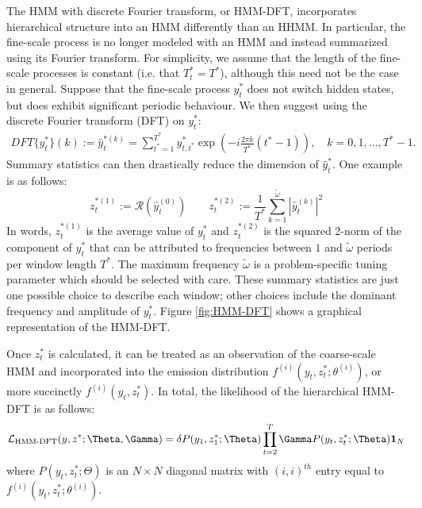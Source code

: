 The HMM with discrete Fourier transform, or HMM-DFT, incorporates hierarchical structure into an HMM differently than an HHMM. In particular, the fine-scale process is no longer modeled with an HMM and instead summarized using its Fourier transform. For simplicity, we assume that the length of the fine-scale processes is constant (i.e. that $T^*_t = T^*$), although this need not be the case in general. Suppose that the fine-scale process $y^*_t$ does not switch hidden states, but does exhibit significant periodic behaviour. We then suggest using the discrete Fourier transform (DFT) on $y^*_t$:
%
\begin{align*}
    DFT\{y^*_t\}(k) := \hat{y}^{*(k)}_{t} = \sum_{t^* = 1}^{T^*} y^*_{t,t^*}\exp\left(-i \frac{2\pi k}{T^*} (t^*-1)\right), \quad k = 0, 1, \ldots, T^*-1.
\end{align*}
%
Summary statistics can then drastically reduce the dimension of $\hat{y}^*_t$. One example is as follows:
%
\begin{equation}
    \label{eqn:z}
    z_t^{*(1)} := \mathcal{R}\left(\hat{y}^{(0)}_t\right) \qquad z_t^{*(2)} := \frac{1}{T^*}\sum_{k=1}^{\tilde{\omega}}|\hat{y}^{(k)}_t|^2
\end{equation}
%
In words, $z_t^{*(1)}$ is the average value of $y^*_t$ and $z_t^{*(2)}$ is the squared 2-norm of the component of $y^*_t$ that can be attributed to frequencies between $1$ and $\tilde{\omega}$ periods per window length $T^*$. The maximum frequency $\tilde{\omega}$ is a problem-specific tuning parameter which should be selected with care. These summary statistics are just one possible choice to describe each window; other choices include the dominant frequency and amplitude of $y^*_t$. Figure \ref{fig:HMM-DFT} shows a graphical representation of the HMM-DFT.

Once $z^*_t$ is calculated, it can be treated as an observation of the coarse-scale HMM and incorporated into the emission distribution $f^{(i)}\left(y_t,z^*_t;\theta^{(i)}\right)$, or more succinctly $f^{(i)}\left(y_t,z^*_t\right)$. In total, the likelihood of the hierarchical HMM-DFT is as follows:
\begin{equation}
    \calL_{\text{HMM-DFT}}(y,z^*;\Theta,\Gamma) = \delta P(y_1,z^*_1;\Theta) \prod_{t=2}^T \Gamma P(y_t,z^*_t;\Theta) \mathbf{1}_N
    \label{HMMDFT_likelihood}
\end{equation}
where $P(y_t,z^*_t;\Theta)$ is an $N \times N$ diagonal matrix with $(i,i)^{th}$ entry equal to $f^{(i)}\left(y_t,z^*_t;\theta^{(i)}\right)$.

